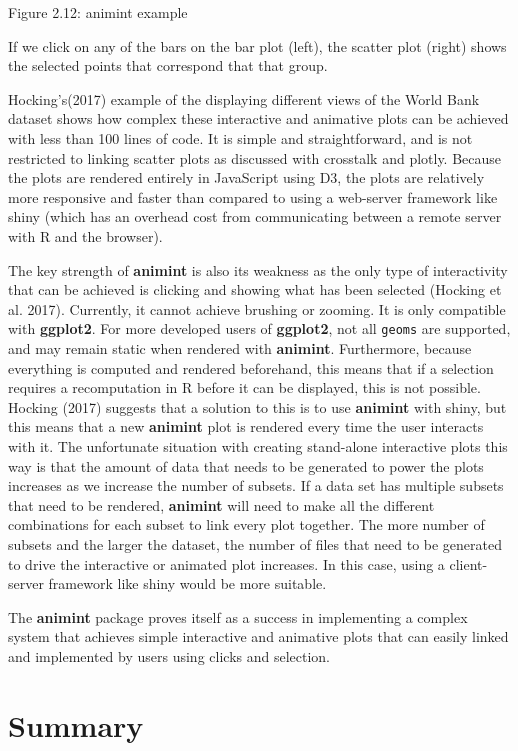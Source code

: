 \documentclass[11pt,]{report}
\begin{document}
Figure 2.12: animint example

If we click on any of the bars on the bar plot (left), the scatter plot
(right) shows the selected points that correspond that that group.

Hocking's(2017) example of the displaying different views of the World
Bank dataset shows how complex these interactive and animative plots can
be achieved with less than 100 lines of code. It is simple and
straightforward, and is not restricted to linking scatter plots as
discussed with crosstalk and plotly. Because the plots are rendered
entirely in JavaScript using D3, the plots are relatively more
responsive and faster than compared to using a web-server framework like
shiny (which has an overhead cost from communicating between a remote
server with R and the browser).

The key strength of \textbf{animint} is also its weakness as the only
type of interactivity that can be achieved is clicking and showing what
has been selected (Hocking et al. 2017). Currently, it cannot achieve
brushing or zooming. It is only compatible with \textbf{ggplot2}. For
more developed users of \textbf{ggplot2}, not all \texttt{geoms} are
supported, and may remain static when rendered with \textbf{animint}.
Furthermore, because everything is computed and rendered beforehand,
this means that if a selection requires a recomputation in R before it
can be displayed, this is not possible. Hocking (2017) suggests that a
solution to this is to use \textbf{animint} with shiny, but this means
that a new \textbf{animint} plot is rendered every time the user
interacts with it. The unfortunate situation with creating stand-alone
interactive plots this way is that the amount of data that needs to be
generated to power the plots increases as we increase the number of
subsets. If a data set has multiple subsets that need to be rendered,
\textbf{animint} will need to make all the different combinations for
each subset to link every plot together. The more number of subsets and
the larger the dataset, the number of files that need to be generated to
drive the interactive or animated plot increases. In this case, using a
client-server framework like shiny would be more suitable.

The \textbf{animint} package proves itself as a success in implementing
a complex system that achieves simple interactive and animative plots
that can easily linked and implemented by users using clicks and
selection.

\section{Summary}\label{summary}
\end{document}
